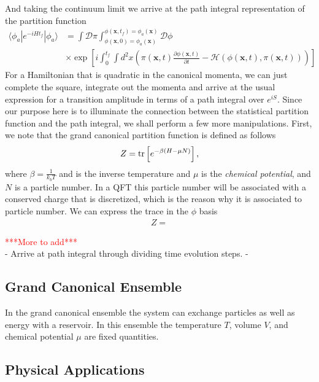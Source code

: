         And taking the continuum limit we arrive at the path integral representation of the partition function
        \begin{align}
            \langle \phi_a | e^{-i H t_f} | \phi_a \rangle &= \int \mathcal{D} \pi \int_{\phi(\bm{x},0) =\phi_a(\bm{x})}^{\phi(\bm{x}, t_f) = \phi_a(\bm{x})} \mathcal{D} \phi \nonumber \\
            &\times \exp \left[i \int_0^{t_f} \int d^2 x \left( \pi(\bm{x} ,t) \frac{\partial\phi(\bm{x}, t)}{ \partial t} - \mathcal{H}\left(\phi(\bm{x},t), \pi(\bm{x},t)\right) \right) \right]
        \end{align}
        For a Hamiltonian that is quadratic in the canonical momenta, we can just complete the square, integrate out the momenta and arrive at the usual expression for a transition amplitude in terms of a path integral over $e^{i S}$. Since our purpose here is to illuminate the connection between the statistical partition function and the path integral, we shall perform a few more manipulations. First, we note that the grand canonical partition function is defined as follows
        \begin{align}
            Z= {\rm tr} \left[e^{-\beta \left( H - \mu N \right)}\right],
        \end{align}
        where $\beta = \frac{1}{k_b T}$ and is the inverse temperature and $\mu$ is the \textit{chemical potential}, and $N$ is a particle number. In a QFT this particle number will be associated with a conserved charge that is discretized, which is the reason why it is associated to particle number. We can express the trace in the $\phi$ basis
        \begin{align}
            Z=
        \end{align}


\textcolor{red}{***More to add***}\\
- Arrive at path integral through dividing time evolution steps.
- 



        \subsection{Grand Canonical Ensemble} \label{GCE_sec}
In the grand canonical ensemble the system can exchange particles as well as energy with a reservoir. In this ensemble the temperature $T$, volume $V$, and chemical potential $\mu$ are fixed quantities.
        \subsection{Physical Applications}\label{phys_app_sec}

